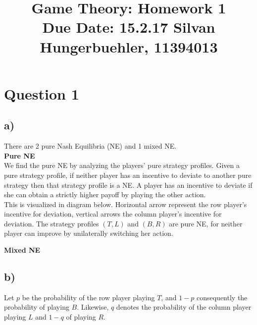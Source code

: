 \documentclass[10pt,a4paper]{article}
\title{%
  Game Theory: Homework 1 \\
  \large Due Date: 15.2.17
  \large Silvan Hungerbuehler, 11394013}
\date{}
\begin{document}
\maketitle

\section*{Question 1}
\subsection*{a)}
There are 2 pure Nash Equilibria (NE) and 1 mixed NE.\\
\textbf{Pure NE}\\
We find the pure NE by analyzing the players' pure strategy profiles. Given a pure strategy profile, if neither player has  an incentive to deviate to another pure strategy then that strategy profile is a NE. A player has an incentive to deviate if she can obtain a strictly higher payoff by playing the other action.\\
This is visualized in diagram below. Horizontal arrow represent the row player's incentive for deviation, vertical arrows the column player's incentive for deviation. The strategy profiles $(T,L)$ and $(B,R)$ are pure NE, for neither player can improve by unilaterally switching her action.

\textbf{Mixed NE}

\subsection*{b)}
Let $p$ be the probability of the row player playing $T$, and $1-p$ consequently the probability of playing $B$. Likewise, $q$ denotes the probability of the column player  playing $L$ and $1-q$ of playing $R$.
\end{document}

